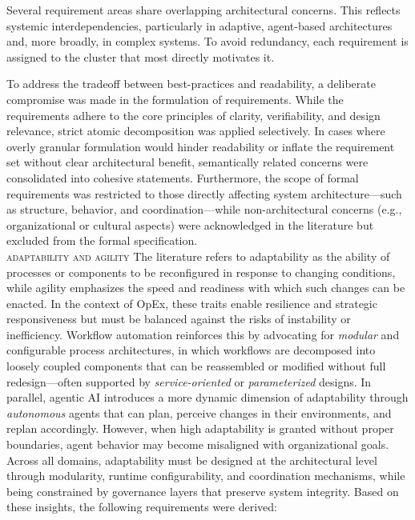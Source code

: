 Several requirement areas share overlapping architectural concerns. This reflects systemic interdependencies, particularly in adaptive, agent-based architectures and, more broadly, in complex systems. To avoid redundancy, each requirement is assigned to the cluster that most directly motivates it.

To address the tradeoff between best-practices and readability, a deliberate compromise was made in the formulation of requirements. While the requirements adhere to the core principles of clarity, verifiability, and design relevance, strict atomic decomposition was applied selectively. In cases where overly granular formulation would hinder readability or inflate the requirement set without clear architectural benefit, semantically related concerns were consolidated into cohesive statements. Furthermore, the scope of formal requirements was restricted to those directly affecting system architecture—such as structure, behavior, and coordination—while non-architectural concerns (e.g., organizational or cultural aspects) were acknowledged in the literature but excluded from the formal specification. \\

\noindent \textsc{adaptability and agility} \quad The literature refers to adaptability as the ability of processes or components to be reconfigured in response to changing conditions, while agility emphasizes the speed and readiness with which such changes can be enacted. In the context of OpEx, these traits enable resilience and strategic responsiveness but must be balanced against the risks of instability or inefficiency. Workflow automation reinforces this by advocating for \emph{modular} and configurable process architectures, in which workflows are decomposed into loosely coupled components that can be reassembled or modified without full redesign—often supported by \emph{service-oriented} or \emph{parameterized} designs. In parallel, agentic AI introduces a more dynamic dimension of adaptability through \emph{autonomous} agents that can plan, perceive changes in their environments, and replan accordingly. However, when high adaptability is granted without proper boundaries, agent behavior may become misaligned with organizational goals. Across all domains, adaptability must be designed at the architectural level through modularity, runtime configurability, and coordination mechanisms, while being constrained by governance layers that preserve system integrity. Based on these insights, the following requirements were derived:

